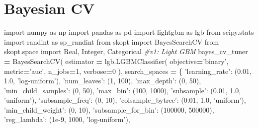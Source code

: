 \documentclass[]{book}
\newenvironment{Shaded}{\begin{snugshade}}{\end{snugshade}}
\newcommand{\DecValTok}[1]{\textcolor[rgb]{0.00,0.00,0.81}{#1}}
\newcommand{\FloatTok}[1]{\textcolor[rgb]{0.00,0.00,0.81}{#1}}
\newcommand{\StringTok}[1]{\textcolor[rgb]{0.31,0.60,0.02}{#1}}
\newcommand{\ImportTok}[1]{#1}
\newcommand{\CommentTok}[1]{\textcolor[rgb]{0.56,0.35,0.01}{\textit{#1}}}
\newcommand{\OperatorTok}[1]{\textcolor[rgb]{0.81,0.36,0.00}{\textbf{#1}}}
\newcommand{\NormalTok}[1]{#1}
\begin{document}
\section{Bayesian CV}\label{bayesian-cv}

\begin{Shaded}
\begin{Highlighting}[]
\ImportTok{import}\NormalTok{ numpy }\ImportTok{as}\NormalTok{ np}
\ImportTok{import}\NormalTok{ pandas }\ImportTok{as}\NormalTok{ pd}
\ImportTok{import}\NormalTok{ lightgbm }\ImportTok{as}\NormalTok{ lgb}
\ImportTok{from}\NormalTok{ scipy.stats }\ImportTok{import}\NormalTok{ randint }\ImportTok{as}\NormalTok{ sp_randint}
\ImportTok{from}\NormalTok{ skopt }\ImportTok{import}\NormalTok{ BayesSearchCV}
\ImportTok{from}\NormalTok{ skopt.space }\ImportTok{import}\NormalTok{ Real, Integer, Categorical}
\CommentTok{#v1: Light GBM}
\NormalTok{bayes_cv_tuner }\OperatorTok{=}\NormalTok{ BayesSearchCV(}
\NormalTok{    estimator }\OperatorTok{=}\NormalTok{ lgb.LGBMClassifier(}
\NormalTok{        objective}\OperatorTok{=}\StringTok{'binary'}\NormalTok{,}
\NormalTok{        metric}\OperatorTok{=}\StringTok{'auc'}\NormalTok{,}
\NormalTok{        n_jobs}\OperatorTok{=}\DecValTok{1}\NormalTok{,}
\NormalTok{        verbose}\OperatorTok{=}\DecValTok{0}
\NormalTok{    ),}
\NormalTok{    search_spaces }\OperatorTok{=}\NormalTok{ \{}
        \StringTok{'learning_rate'}\NormalTok{: (}\FloatTok{0.01}\NormalTok{, }\FloatTok{1.0}\NormalTok{, }\StringTok{'log-uniform'}\NormalTok{),}
        \StringTok{'num_leaves'}\NormalTok{: (}\DecValTok{1}\NormalTok{, }\DecValTok{100}\NormalTok{),      }
        \StringTok{'max_depth'}\NormalTok{: (}\DecValTok{0}\NormalTok{, }\DecValTok{50}\NormalTok{),}
        \StringTok{'min_child_samples'}\NormalTok{: (}\DecValTok{0}\NormalTok{, }\DecValTok{50}\NormalTok{),}
        \StringTok{'max_bin'}\NormalTok{: (}\DecValTok{100}\NormalTok{, }\DecValTok{1000}\NormalTok{),}
        \StringTok{'subsample'}\NormalTok{: (}\FloatTok{0.01}\NormalTok{, }\FloatTok{1.0}\NormalTok{, }\StringTok{'uniform'}\NormalTok{),}
        \StringTok{'subsample_freq'}\NormalTok{: (}\DecValTok{0}\NormalTok{, }\DecValTok{10}\NormalTok{),}
        \StringTok{'colsample_bytree'}\NormalTok{: (}\FloatTok{0.01}\NormalTok{, }\FloatTok{1.0}\NormalTok{, }\StringTok{'uniform'}\NormalTok{),}
        \StringTok{'min_child_weight'}\NormalTok{: (}\DecValTok{0}\NormalTok{, }\DecValTok{10}\NormalTok{),}
        \StringTok{'subsample_for_bin'}\NormalTok{: (}\DecValTok{100000}\NormalTok{, }\DecValTok{500000}\NormalTok{),}
        \StringTok{'reg_lambda'}\NormalTok{: (}\FloatTok{1e-9}\NormalTok{, }\DecValTok{1000}\NormalTok{, }\StringTok{'log-uniform'}\NormalTok{),}

\end{Highlighting}
\end{Shaded}
\end{document}
